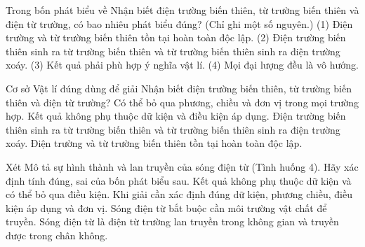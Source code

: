 \begin{ex}
Trong bốn phát biểu về Nhận biết điện trường biến thiên, từ trường biến thiên và điện từ trường, có bao nhiêu phát biểu đúng? (Chỉ ghi một số nguyên.) (1) Điện trường và từ trường biến thiên tồn tại hoàn toàn độc lập. (2) Điện trường biến thiên sinh ra từ trường biến thiên và từ trường biến thiên sinh ra điện trường xoáy. (3) Kết quả phải phù hợp ý nghĩa vật lí. (4) Mọi đại lượng đều là vô hướng.
\end{ex}

\begin{ex}
Cơ sở Vật lí đúng dùng để giải Nhận biết điện trường biến thiên, từ trường biến thiên và điện từ trường?
\choice
{Có thể bỏ qua phương, chiều và đơn vị trong mọi trường hợp.}
{Kết quả không phụ thuộc dữ kiện và điều kiện áp dụng.}
{\True Điện trường biến thiên sinh ra từ trường biến thiên và từ trường biến thiên sinh ra điện trường xoáy.}
{Điện trường và từ trường biến thiên tồn tại hoàn toàn độc lập.}
\end{ex}

\begin{ex}
Xét Mô tả sự hình thành và lan truyền của sóng điện từ (Tình huống 4). Hãy xác định tính đúng, sai của bốn phát biểu sau.
\choiceTF
{Kết quả không phụ thuộc dữ kiện và có thể bỏ qua điều kiện.}
{\True Khi giải cần xác định đúng dữ kiện, phương chiều, điều kiện áp dụng và đơn vị.}
{Sóng điện từ bắt buộc cần môi trường vật chất để truyền.}
{\True Sóng điện từ là điện từ trường lan truyền trong không gian và truyền được trong chân không.}
\end{ex}


